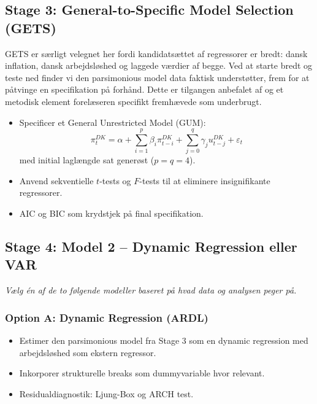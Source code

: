 \subsection{Stage 3: General-to-Specific Model Selection (GETS)}

GETS er særligt velegnet her fordi kandidatsættet af regressorer er bredt:
dansk inflation, dansk arbejdsløshed og laggede værdier af begge. Ved at
starte bredt og teste ned finder vi den parsimonious model data faktisk
understøtter, frem for at påtvinge en specifikation på forhånd. Dette er
tilgangen anbefalet af \textcite{doornik2018} og et metodisk element
forelæseren specifikt fremhævede som underbrugt.

\begin{itemize}[nosep]
    \item Specificer et General Unrestricted Model (GUM):
          \[
          \pi_t^{DK} = \alpha
            + \sum_{i=1}^{p} \beta_i \pi_{t-i}^{DK}
            + \sum_{j=0}^{q} \gamma_j u_{t-j}^{DK}
            + \varepsilon_t
          \]
          med initial laglængde sat generøst ($p = q = 4$).
    \item Anvend sekventielle $t$-tests og $F$-tests til at eliminere
          insignifikante regressorer.
    \item AIC og BIC som krydstjek på final specifikation.
\end{itemize}

\subsection{Stage 4: Model 2 -- Dynamic Regression eller VAR}

\textit{Vælg én af de to følgende modeller baseret på hvad data og
analysen peger på.}

\subsubsection{Option A: Dynamic Regression (ARDL)}

\begin{itemize}[nosep]
    \item Estimer den parsimonious model fra Stage 3 som en dynamic
          regression med arbejdsløshed som ekstern regressor.
    \item Inkorporer strukturelle breaks som dummyvariable hvor relevant.
    \item Residualdiagnostik: Ljung-Box og ARCH test.
\end{itemize}


